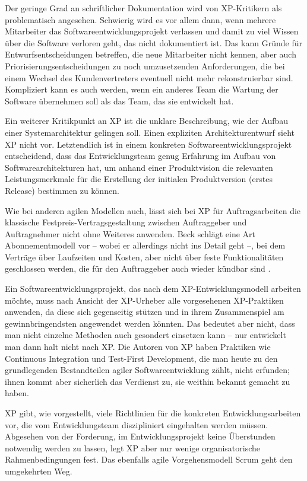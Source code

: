 Der geringe Grad an schriftlicher Dokumentation wird von XP-Kritikern als problematisch angesehen. Schwierig wird es vor allem dann, wenn mehrere Mitarbeiter das Softwareentwicklungsprojekt verlassen und damit zu viel Wissen über die Software verloren geht, das nicht dokumentiert ist. Das kann Gründe für Entwurfsentscheidungen betreffen, die neue Mitarbeiter nicht kennen, aber auch Priorisierungs\-entscheidungen zu noch umzusetzenden Anforderungen, die bei einem Wechsel des Kundenvertreters eventuell nicht mehr rekonstruierbar sind. Kompliziert kann es auch werden, wenn ein anderes Team die Wartung der Software übernehmen soll als das Team, das sie entwickelt hat. 

Ein weiterer Kritikpunkt an XP ist die unklare Beschreibung, wie der Aufbau einer Systemarchitektur gelingen soll. Einen expliziten Architekturentwurf sieht XP nicht vor. Letztendlich ist in einem konkreten Softwareentwicklungsprojekt entscheidend, dass das Entwicklungsteam genug Erfahrung im Aufbau von Softwarearchitekturen hat, um anhand einer Produktvision %
die relevanten Leistungsmerkmale für die Erstellung der initialen Produktversion (erstes Release) bestimmen zu können.

Wie bei anderen agilen Modellen auch, lässt sich bei XP für Auftragsarbeiten die klassische Festpreis-Vertragsgestaltung zwischen Auftraggeber und Auftragnehmer nicht ohne Weiteres anwenden. Beck schlägt eine Art Abonnementmodell vor – wobei er allerdings nicht ins Detail geht –, bei dem Verträge über Laufzeiten und Kosten, aber nicht über feste Funktionalitäten geschlossen werden, die für den Auftraggeber auch wieder kündbar sind \cite[160]{bec03}. 

Ein Softwareentwicklungsprojekt, das nach dem XP-Entwicklungsmodell arbeiten möchte, muss nach Ansicht der XP-Urheber alle vorgesehenen XP-Praktiken anwenden, da diese sich gegenseitig stützen und in ihrem Zusammenspiel am gewinnbringendsten angewendet werden könnten. Das bedeutet aber nicht, dass man nicht einzelne Methoden auch gesondert einsetzen kann – nur entwickelt man dann halt nicht nach XP. Die Autoren von XP haben Praktiken wie Continuous Integration und Test-First Development, die man heute zu den grundlegenden Bestandteilen agiler Softwareentwicklung zählt, nicht erfunden; ihnen kommt aber sicherlich das Verdienst zu, sie weithin bekannt gemacht zu haben.

XP gibt, wie vorgestellt, viele Richtlinien für die konkreten Entwicklungsarbeiten vor, die vom Entwicklungsteam diszipliniert eingehalten werden müssen. Abgesehen von der Forderung, im Entwicklungsprojekt keine Überstunden notwendig werden zu lassen, legt XP aber nur wenige organisatorische Rahmenbedingungen fest. Das ebenfalls agile Vorgehensmodell Scrum geht den umgekehrten Weg.

\vspace{\baselineskip} %

